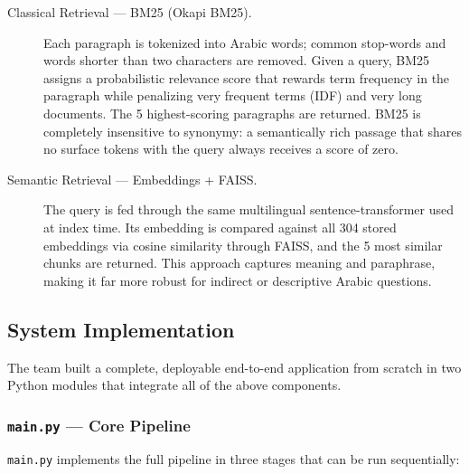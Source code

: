 \begin{description}
  \item[Classical Retrieval --- BM25 (Okapi BM25).]
        Each paragraph is tokenized into Arabic words; common stop-words
        and words shorter than two characters are removed.  Given a query,
        BM25 assigns a probabilistic relevance score that rewards term
        frequency in the paragraph while penalizing very frequent terms
        (IDF) and very long documents.  The 5 highest-scoring
        paragraphs are returned.  BM25 is completely insensitive to
        synonymy: a semantically rich passage that shares no surface tokens
        with the query always receives a score of zero.

  \item[Semantic Retrieval --- Embeddings + FAISS.]
        The query is fed through the same multilingual sentence-transformer
        used at index time.  Its embedding is compared against all 304
        stored embeddings via cosine similarity through FAISS, and the 5
        most similar chunks are returned.  This approach captures
        meaning and paraphrase, making it far more robust for indirect or
        descriptive Arabic questions.
\end{description}

\subsection{System Implementation}

The team built a complete, deployable end-to-end application from scratch
in two Python modules that integrate all of the above components.

\subsubsection{\texttt{main.py} --- Core Pipeline}

\texttt{main.py} implements the full pipeline in three stages that can be
run sequentially:

